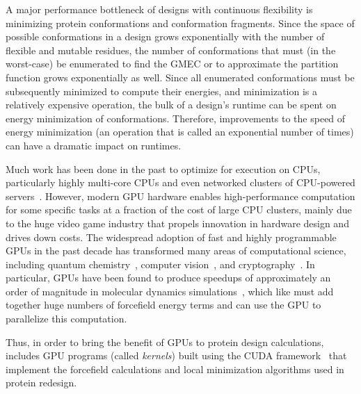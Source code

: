 A major performance bottleneck of \osprey designs with continuous flexibility is minimizing protein conformations and conformation fragments. Since the space of possible conformations in a design grows exponentially with the number of flexible and mutable residues, the number of conformations that must (in the worst-case) be enumerated to find the GMEC or to approximate the partition function grows exponentially as well. Since all enumerated conformations must be subsequently minimized to compute their energies, and minimization is a relatively expensive operation, the bulk of a design's runtime can be spent on energy minimization of conformations. Therefore, improvements to the speed of energy minimization (an operation that is called an exponential number of times) can have a dramatic impact on \osprey runtimes.

Much work has been done in the past to optimize \osprey for execution on CPUs, particularly highly multi-core CPUs and even networked clusters of CPU-powered servers~\cite{minBounds_DACS,cloud_OSPREY}. However, modern GPU hardware enables high-performance computation for some specific tasks at a fraction of the cost of large CPU clusters, mainly due to the huge video game industry that propels innovation in hardware design and drives down costs. The widespread adoption of fast and highly programmable GPUs in the past decade has transformed many areas of computational science, including quantum chemistry~\cite{GPU_QM}, computer vision~\cite{ResNet}, and cryptography~\cite{GPU_crypto}.  In particular, GPUs have been found to produce speedups of approximately an order of magnitude in molecular dynamics simulations~\cite{HOOMD_GPU,AMBER_GPU_microseconds,GROMACS_GPU}, which like \osprey must add together huge numbers of forcefield energy terms and can use the GPU to parallelize this computation.  

Thus, in order to bring the benefit of GPUs to protein design calculations,  includes GPU programs (called {\it kernels}) built using the CUDA framework~\cite{nvidia2010programming} that implement the forcefield calculations and local minimization algorithms used in protein redesign.

